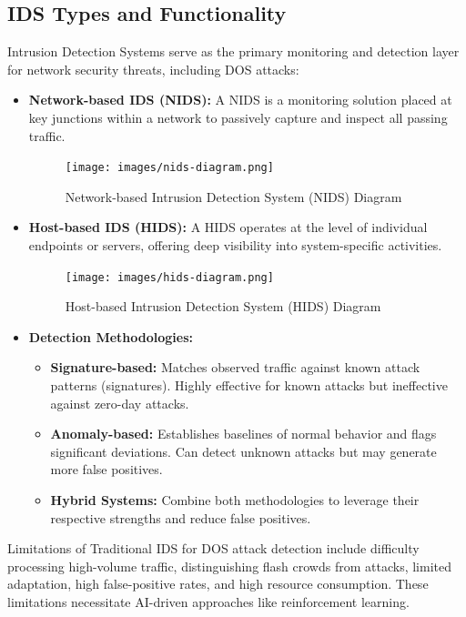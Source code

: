 \documentclass[12pt]{report}
\begin{document}
\subsection{IDS Types and Functionality}
Intrusion Detection Systems serve as the primary monitoring and detection layer for network security threats, including DOS attacks:
\begin{itemize}
    \item \textbf{Network-based IDS (NIDS):} A NIDS is a monitoring solution placed at key junctions within a network to passively capture and inspect all passing traffic.
        \begin{figure}[ht]
            \centering
            \texttt{[image: images/nids-diagram.png]}
            \caption{Network-based Intrusion Detection System (NIDS) Diagram}
            \label{fig:nids-diagram}
        \end{figure}
    \item \textbf{Host-based IDS (HIDS):} A HIDS operates at the level of individual endpoints or servers, offering deep visibility into system-specific activities.
        \begin{figure}[ht]
            \centering
            \texttt{[image: images/hids-diagram.png]}
            \caption{Host-based Intrusion Detection System (HIDS) Diagram}
            \label{fig:hids-diagram}
        \end{figure}
    \item \textbf{Detection Methodologies:}
    \begin{itemize}
        \item \textbf{Signature-based:} Matches observed traffic against known attack patterns (signatures). Highly effective for known attacks but ineffective against zero-day attacks.
        \item \textbf{Anomaly-based:} Establishes baselines of normal behavior and flags significant deviations. Can detect unknown attacks but may generate more false positives.
        \item \textbf{Hybrid Systems:} Combine both methodologies to leverage their respective strengths and reduce false positives.
    \end{itemize}
\end{itemize}

Limitations of Traditional IDS for DOS attack detection include difficulty processing high-volume traffic, distinguishing flash crowds from attacks, limited adaptation, high false-positive rates, and high resource consumption. These limitations necessitate AI-driven approaches like reinforcement learning.
\end{document}
